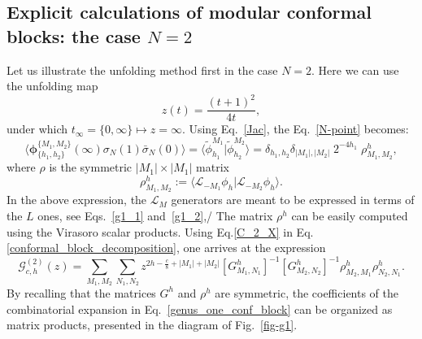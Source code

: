 \documentclass[a4paper,11pt]{article}
\begin{document}
 

\subsection{Explicit calculations of modular conformal blocks: the case $N=2$}
Let us illustrate the unfolding method first in the case $N=2$. Here  we can use the unfolding  map
\begin{equation}\label{g_one_covering_map}
 z(t)=\frac{(t+1)^2}{4t},
\end{equation}
under which  $t_{\infty}=\{0,\infty\}\mapsto z=\infty$.
Using Eq.~\eqref{Jac}, the  Eq.~\eqref{N-point}  becomes:
\begin{equation}\label{C_2_X}
 \langle \boldsymbol{\phi}^{\{M_1,M_2\}}_{\{h_1,h_2\}}(\infty) \sigma_{N}(1)\bar{\sigma}_{N}(0)\rangle=\langle \tilde{\phi}_{h_1}^{M_1} | \tilde{\phi}_{h_2}^{M_2}\rangle=
 \delta_{h_1, h_2}\delta_{|M_1|,|M_2|}\;2^{-4 h_1} \;\rho^h_{M_1,M_2},
\end{equation}
where $\rho$ is the symmetric $|M_1|\times|M_1|$ matrix
\begin{equation}
\label{rho}
 \rho^h_{M_1,M_2}:=\langle \mathcal{L}_{-M_1}\phi_{h}|\mathcal{L}_{-M_2}\phi_{h}\rangle.
\end{equation}
In the above expression,  the $\mathcal{L}_M$ generators are meant to be expressed in terms of the $L$  ones, see Eqs.~\eqref{g1_1} and~\eqref{g1_2},/ The matrix $\rho^h$  can be easily computed using the Virasoro scalar products.
Using Eq.\eqref{C_2_X} in Eq.\eqref{conformal_block_decomposition}, one arrives at the expression
\begin{equation}\label{genus_one_conf_block}
 \mathcal{G}_{c, h}^{(2)}(z)=\sum_{M_1, M_2}\sum_{N_1, N_2}
 z^{2h-\frac{c}{8}+|M_1|+|M_2|}[G^{h}_{M_1,N_1}]^{-1}[G^{h}_{ M_2,N_2}]^{-1}
 \rho^h_{M_2,M_1}\rho^h_{N_2,N_1}.
\end{equation}
By recalling that the matrices $G^h$ and $\rho^h$ are symmetric, the coefficients of the combinatorial 
expansion in Eq.~\eqref{genus_one_conf_block} can be organized as 
matrix products, presented in the diagram of Fig.~\ref{fig-g1}. 
\end{document}
